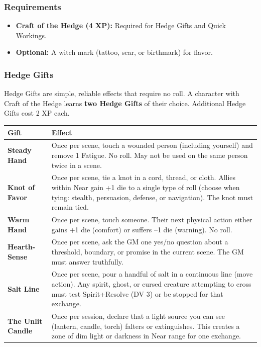 \subsubsection{Requirements}
\begin{itemize}
  \item \textbf{Craft of the Hedge (4 XP):} Required for Hedge Gifts and Quick Workings.
  \item \textbf{Optional:} A witch mark (tattoo, scar, or birthmark) for flavor.
\end{itemize}

\subsubsection{Hedge Gifts}

Hedge Gifts are simple, reliable effects that require no roll. A character with Craft of the Hedge learns \textbf{two Hedge Gifts} of their choice. Additional Hedge Gifts cost 2 XP each.

\begin{longtable}{@{}p{3.5cm}p{8cm}@{}}
\toprule
\textbf{Gift} & \textbf{Effect} \\
\midrule
\endhead
\bottomrule
\endfoot
\textbf{Steady Hand} & Once per scene, touch a wounded person (including yourself) and remove 1 Fatigue. No roll. May not be used on the same person twice in a scene. \\
\textbf{Knot of Favor} & Once per scene, tie a knot in a cord, thread, or cloth. Allies within Near gain +1 die to a single type of roll (choose when tying: stealth, persuasion, defense, or navigation). The knot must remain tied. \\
\textbf{Warm Hand} & Once per scene, touch someone. Their next physical action either gains +1 die (comfort) or suffers --1 die (warning). No roll. \\
\textbf{Hearth-Sense} & Once per scene, ask the GM one yes/no question about a threshold, boundary, or promise in the current scene. The GM must answer truthfully. \\
\textbf{Salt Line} & Once per scene, pour a handful of salt in a continuous line (move action). Any spirit, ghost, or cursed creature attempting to cross must test Spirit+Resolve (DV 3) or be stopped for that exchange. \\
\textbf{The Unlit Candle} & Once per session, declare that a light source you can see (lantern, candle, torch) falters or extinguishes. This creates a zone of dim light or darkness in Near range for one exchange. \\
\bottomrule
\end{longtable}

